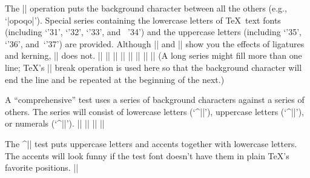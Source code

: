 The |\series| operation puts the background character between all the
others (e.g., `|opoqo|'). Special series containing the lowercase
letters of \TeX\ text fonts (including `\char'31', `\char'32',
`\char'33', and ~\char'34') and the uppercase letters (including
`\char'35', `\char'36', and~`\char'37') are provided.
Although |\mixture| and |\alternation| show you the effects of
ligatures and kerning, |\series| does not.
\beginlines
|\def\!{\discretionary{\background}{\background}{\background}}|
|\def\series{\promptthree \!\doseries\starting\ending\par}|
|\def\doseries#1#2{\n=#1\loop\char\n\!\ifnum\n<#2\advance\n 1 \repeat}|
|\def\complower{\!\doseries{`a}{`z}\doseries{'31}{'34}\par}|
|\def\compupper{\!\doseries{`A}{`Z}\doseries{'35}{'37}\par}|
|\def\compdigs{\!\doseries{`0}{`9}\par}|
|\def\alphabet{\setchar\background\complower}|
|\def\ALPHABET{\setchar\background\compupper}|
\endlines
(A long series might fill more than one line; \TeX's |\discretionary|
break operation is used here so that the background character will end
the line and be repeated at the beginning of the next.)

A ``comprehensive'' test uses a series of background characters
against a series of others. The series will consist of lowercase
letters (`^|\lowers|'), uppercase letters (`^|\uppers|'), or
numerals (`^|\digits|').
\beginlines
|\def\lowers{\docomprehensive\complower{`a}{`z}{'31}{'34}}|
|\def\uppers{\docomprehensive\compupper{`A}{`Z}{'35}{'37}}|
|\def\digits{\docomprehensive\compdigs{`0}{`4}{`5}{`9}}|
|\def\docomprehensive#1#2#3#4#5{\par\chardef\background=#2|
|  \loop{#1} \ifnum\background<#3\m=\background\advance\m 1|
|  \chardef\background=\m \repeat \chardef\background=#4|
|  \loop{#1} \ifnum\background<#5\m=\background\advance\m 1|
|  \chardef\background=\m \repeat}|
\endlines

The ^|\names| test puts uppercase letters and accents
together with lowercase letters. The accents will look funny
if the test font doesn't have them in plain \TeX's favorite positions.
\beginlines
|\def\names{ {\AA}ngel\aa\ Beatrice Claire|
|  Diana \'Erica Fran\c{c}oise Ginette H\'el\`ene Iris|
|  Jackie K\=aren {\L}au\.ra Mar{\'\i}a N\H{a}ta{\l}{\u\i}e {\O}ctave|
|  Pauline Qu\^eneau Roxanne Sabine T\~a{\'\j}a Ur\v{s}ula|
|  Vivian Wendy Xanthippe Yv{\o}nne Z\"azilie\par}|
\endlines

